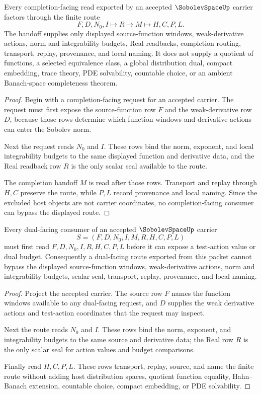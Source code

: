 \begin{theorem}
\label{thm:sobolev-space-completion-handoff}
Every completion-facing read exported by an accepted $\SobolevSpaceUp$ carrier factors through the finite route
$$
F,D,N_0,I \longmapsto R \longmapsto M \longmapsto H,C,P,L.
$$
The handoff supplies only displayed source-function windows, weak-derivative actions, norm and integrability budgets, Real readbacks, completion routing, transport, replay, provenance, and local naming. It does not supply a quotient of functions, a selected equivalence class, a global distribution dual, compact embedding, trace theory, PDE solvability, countable choice, or an ambient Banach-space completeness theorem.
\end{theorem}
\begin{proof}
Begin with a completion-facing request for an accepted carrier. The request must first expose the source-function row $F$ and the weak-derivative row $D$, because those rows determine which function windows and derivative actions can enter the Sobolev norm.

Next the request reads $N_0$ and $I$. These rows bind the norm, exponent, and local integrability budgets to the same displayed function and derivative data, and the Real readback row $R$ is the only scalar seal available to the route.

The completion handoff $M$ is read after those rows. Transport and replay through $H,C$ preserve the route, while $P,L$ record provenance and local naming. Since the excluded host objects are not carrier coordinates, no completion-facing consumer can bypass the displayed route.
\end{proof}

\begin{theorem}
\label{thm:sobolev-space-dual-test-action}
Every dual-facing consumer of an accepted $\SobolevSpaceUp$ carrier
$$
S=(F,D,N_0,I,M,R,H,C,P,L)
$$
must first read $F,D,N_0,I,R,H,C,P,L$ before it can expose a test-action value or dual budget. Consequently a dual-facing route exported from this packet cannot bypass the displayed source-function windows, weak-derivative actions, norm and integrability budgets, scalar seal, transport, replay, provenance, and local naming.
\end{theorem}
\begin{proof}
Project the accepted carrier. The source row $F$ names the function windows available to any dual-facing request, and $D$ supplies the weak derivative actions and test-action coordinates that the request may inspect.

Next the route reads $N_0$ and $I$. These rows bind the norm, exponent, and integrability budgets to the same source and derivative data; the Real row $R$ is the only scalar seal for action values and budget comparisons.

Finally read $H,C,P,L$. These rows transport, replay, source, and name the finite route without adding host distribution spaces, quotient function equality, Hahn--Banach extension, countable choice, compact embedding, or PDE solvability.
\end{proof}

